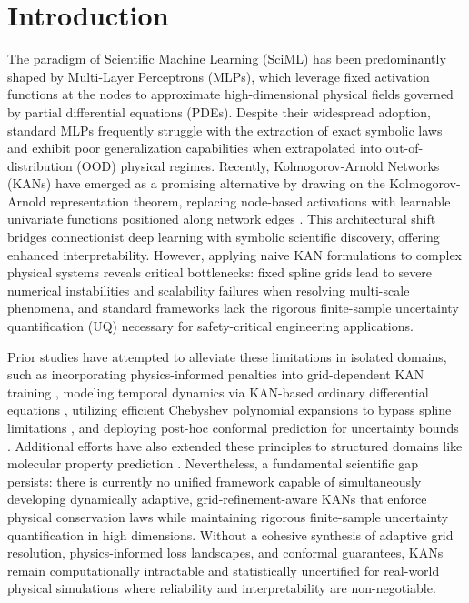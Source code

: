 \documentclass[10pt,twocolumn]{article}
\begin{document}
\section{Introduction}
The paradigm of Scientific Machine Learning (SciML) has been predominantly shaped by Multi-Layer Perceptrons (MLPs), which leverage fixed activation functions at the nodes to approximate high-dimensional physical fields governed by partial differential equations (PDEs). Despite their widespread adoption, standard MLPs frequently struggle with the extraction of exact symbolic laws and exhibit poor generalization capabilities when extrapolated into out-of-distribution (OOD) physical regimes. Recently, Kolmogorov-Arnold Networks (KANs) have emerged as a promising alternative by drawing on the Kolmogorov-Arnold representation theorem, replacing node-based activations with learnable univariate functions positioned along network edges \cite{target_ref}. This architectural shift bridges connectionist deep learning with symbolic scientific discovery, offering enhanced interpretability. However, applying naive KAN formulations to complex physical systems reveals critical bottlenecks: fixed spline grids lead to severe numerical instabilities and scalability failures when resolving multi-scale phenomena, and standard frameworks lack the rigorous finite-sample uncertainty quantification (UQ) necessary for safety-critical engineering applications.

Prior studies have attempted to alleviate these limitations in isolated domains, such as incorporating physics-informed penalties into grid-dependent KAN training \cite{ref_3}, modeling temporal dynamics via KAN-based ordinary differential equations \cite{ref_4}, utilizing efficient Chebyshev polynomial expansions to bypass spline limitations \cite{ref_5}, and deploying post-hoc conformal prediction for uncertainty bounds \cite{ref_1}. Additional efforts have also extended these principles to structured domains like molecular property prediction \cite{ref_2}. Nevertheless, a fundamental scientific gap persists: there is currently no unified framework capable of simultaneously developing dynamically adaptive, grid-refinement-aware KANs that enforce physical conservation laws while maintaining rigorous finite-sample uncertainty quantification in high dimensions. Without a cohesive synthesis of adaptive grid resolution, physics-informed loss landscapes, and conformal guarantees, KANs remain computationally intractable and statistically uncertified for real-world physical simulations where reliability and interpretability are non-negotiable.
\end{document}
